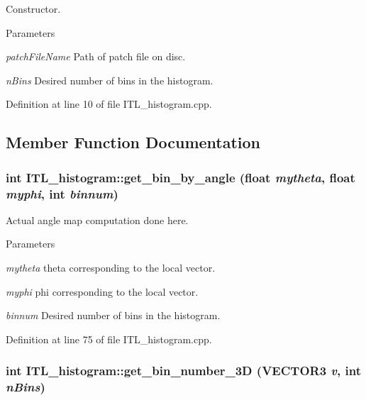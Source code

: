 Constructor. 


\begin{DoxyParams}{Parameters}
\item[{\em patchFileName}]Path of patch file on disc. \item[{\em nBins}]Desired number of bins in the histogram. \end{DoxyParams}


Definition at line 10 of file ITL\_\-histogram.cpp.



\subsection{Member Function Documentation}
\hypertarget{classITL__histogram_a0f3a4726fd8f77aec337c2097d43a533}{
\subsubsection[{get\_\-bin\_\-by\_\-angle}]{\setlength{\rightskip}{0pt plus 5cm}int ITL\_\-histogram::get\_\-bin\_\-by\_\-angle (float {\em mytheta}, \/  float {\em myphi}, \/  int {\em binnum})}}
\label{classITL__histogram_a0f3a4726fd8f77aec337c2097d43a533}


Actual angle map computation done here. 


\begin{DoxyParams}{Parameters}
\item[{\em mytheta}]theta corresponding to the local vector. \item[{\em myphi}]phi corresponding to the local vector. \item[{\em binnum}]Desired number of bins in the histogram. \end{DoxyParams}


Definition at line 75 of file ITL\_\-histogram.cpp.

\hypertarget{classITL__histogram_a18c5da3a4545be422d7b33c0dd1d0594}{
\subsubsection[{get\_\-bin\_\-number\_\-3D}]{\setlength{\rightskip}{0pt plus 5cm}int ITL\_\-histogram::get\_\-bin\_\-number\_\-3D ({\bf VECTOR3} {\em v}, \/  int {\em nBins})}}
\label{classITL__histogram_a18c5da3a4545be422d7b33c0dd1d0594}


